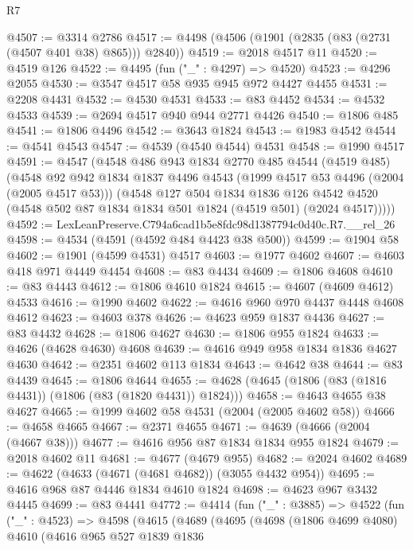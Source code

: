 \begin{lexlean}{R7}
\begin{coremodule}
@4507 := @3314 @2786
@4517 := @4498 (@4506 (@1901 (@2835 (@83 (@2731 (@4507 @401 @38) @865))) @2840))
@4519 := @2018 @4517 @11
@4520 := @4519 @126
@4522 := @4495 (fun ("_" : @4297) => @4520)
@4523 := @4296 @2055
@4530 := @3547 @4517 @58 @935 @945 @972 @4427 @4455
@4531 := @2208 @4431
@4532 := @4530 @4531
@4533 := @83 @4452
@4534 := @4532 @4533
@4539 := @2694 @4517 @940 @944 @2771 @4426
@4540 := @1806 @485
@4541 := @1806 @4496
@4542 := @3643 @1824
@4543 := @1983 @4542
@4544 := @4541 @4543
@4547 := @4539 (@4540 @4544) @4531
@4548 := @1990 @4517
@4591 := @4547
    (@4548
      @486
      @943
      @1834
      @2770
      @485
      @4544
      (@4519 @485)
      (@4548
        @92
        @942
        @1834
        @1837
        @4496
        @4543
        (@1999 @4517 @53 @4496 (@2004 (@2005 @4517 @53)))
        (@4548
          @127
          @504
          @1834
          @1836
          @126
          @4542
          @4520
          (@4548 @502 @87 @1834 @1834 @501 @1824 (@4519 @501) (@2024 @4517)))))
@4592 := LexLeanPreserve.C794a6cad1b5e8fdc98d1387794c0d40c.R7.__rel_26
@4598 := @4534 (@4591 (@4592 @484 @4423 @38 @500))
@4599 := @1904 @58
@4602 := @1901 (@4599 @4531) @4517
@4603 := @1977 @4602
@4607 := @4603 @418 @971 @4449 @4454
@4608 := @83 @4434
@4609 := @1806 @4608
@4610 := @83 @4443
@4612 := @1806 @4610 @1824
@4615 := @4607 (@4609 @4612) @4533
@4616 := @1990 @4602
@4622 := @4616 @960 @970 @4437 @4448 @4608 @4612
@4623 := @4603 @378
@4626 := @4623 @959 @1837 @4436
@4627 := @83 @4432
@4628 := @1806 @4627
@4630 := @1806 @955 @1824
@4633 := @4626 (@4628 @4630) @4608
@4639 := @4616 @949 @958 @1834 @1836 @4627 @4630
@4642 := @2351 @4602 @113 @1834
@4643 := @4642 @38
@4644 := @83 @4439
@4645 := @1806 @4644
@4655 := @4628 (@4645 (@1806 (@83 (@1816 @4431)) (@1806 (@83 (@1820 @4431)) @1824)))
@4658 := @4643 @4655 @38 @4627
@4665 := @1999 @4602 @58 @4531 (@2004 (@2005 @4602 @58))
@4666 := @4658 @4665
@4667 := @2371 @4655
@4671 := @4639 (@4666 (@2004 (@4667 @38)))
@4677 := @4616 @956 @87 @1834 @1834 @955 @1824
@4679 := @2018 @4602 @11
@4681 := @4677 (@4679 @955)
@4682 := @2024 @4602
@4689 := @4622 (@4633 (@4671 (@4681 @4682)) (@3055 @4432 @954))
@4695 := @4616 @968 @87 @4446 @1834 @4610 @1824
@4698 := @4623 @967 @3432 @4445
@4699 := @83 @4441
@4772 := @4414
    (fun ("_" : @3885) =>
    @4522
      (fun ("_" : @4523) =>
      @4598
        (@4615
          (@4689
            (@4695
              (@4698
                (@1806 @4699 @4080)
                @4610
                (@4616
                  @965
                  @527
                  @1839
                  @1836

\end{coremodule}
\end{lexlean}
